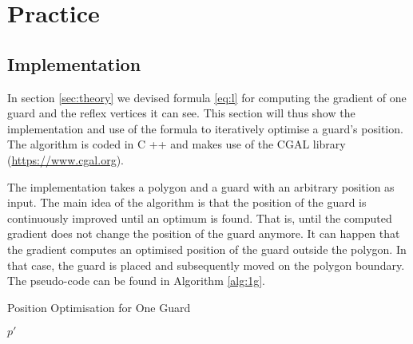 \section{Practice}
\label{sec:experiments}

\subsection{Implementation}
In section \ref{sec:theory} we devised formula \ref{eq:l} for computing the gradient of one guard and the reflex vertices it can see. This section will thus show the implementation and use of the formula to iteratively optimise a guard's position. The algorithm is coded in C ++ and makes use of the CGAL library (\url{https://www.cgal.org}).

The implementation takes a polygon and a guard with an arbitrary position as input. The main idea of the algorithm is that the position of the guard is continuously improved until an optimum is found. That is, until the computed gradient does not change the position of the guard anymore.
It can happen that the gradient computes an optimised position of the guard outside the polygon. In that case, the guard is placed and subsequently moved on the polygon boundary. The pseudo-code can be found in Algorithm \ref{alg:1g}.

\begin{algorithm}[H]
    \begin{algorithmic}[1]
    \caption{Position Optimisation for One Guard}
    \label{alg:1g}

    \State{}


        \EndIf
    \EndWhile
    \State \Return $p'$
    \end{algorithmic}
\end{algorithm}

